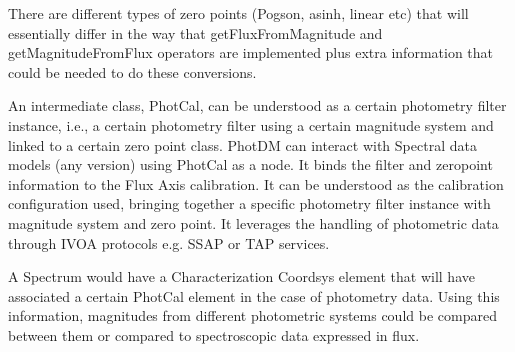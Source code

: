 \documentclass[11pt,a4paper]{ivoa}
\begin{document}
There are different types of zero points (Pogson, asinh, linear etc) that will
essentially differ in the way that getFluxFromMagnitude and getMagnitudeFromFlux
operators are implemented plus extra information that could be needed to do
these conversions.
\par

An intermediate class, PhotCal, can be understood as a certain photometry
filter instance, i.e., a certain photometry filter using a certain magnitude
system and linked to a certain zero point class.
PhotDM can interact with Spectral data models (any version) using PhotCal
as a node. It binds the filter and
zeropoint information to the Flux Axis calibration. It can be understood as the
calibration configuration used, bringing together a specific photometry filter
instance with magnitude system and zero point. It leverages the handling of
photometric data through IVOA protocols e.g. SSAP or TAP services.
\par

A Spectrum would have a Characterization Coordsys element that will have
associated a certain PhotCal element in the case of photometry data. Using
this information, magnitudes from different photometric systems could be
compared between them or compared to spectroscopic data expressed in flux.
\par
\end{document}
